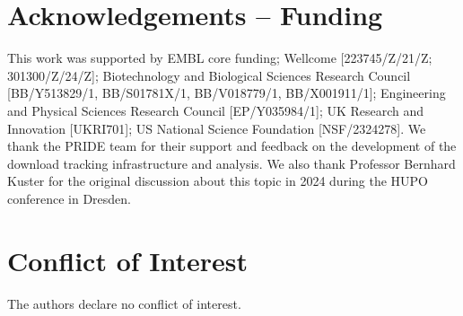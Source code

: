 \documentclass[11pt,a4paper]{article}
\begin{document}
\section*{Acknowledgements -- Funding}

\begin{sloppypar}
This work was supported by EMBL core funding; Wellcome [223745/Z/21/Z; 301300/Z/24/Z]; Biotechnology and Biological Sciences Research Council [BB/Y513829/1, BB/S01781X/1, BB/V018779/1, BB/X001911/1]; Engineering and Physical Sciences Research Council [EP/Y035984/1]; UK Research and Innovation [UKRI701]; US National Science Foundation [NSF/2324278]. We thank the PRIDE team for their support and feedback on the development of the download tracking infrastructure and analysis. We also thank Professor Bernhard Kuster for the original discussion about this topic in 2024 during the HUPO conference in Dresden.
\end{sloppypar}

\section*{Conflict of Interest}

The authors declare no conflict of interest.



\end{document}
